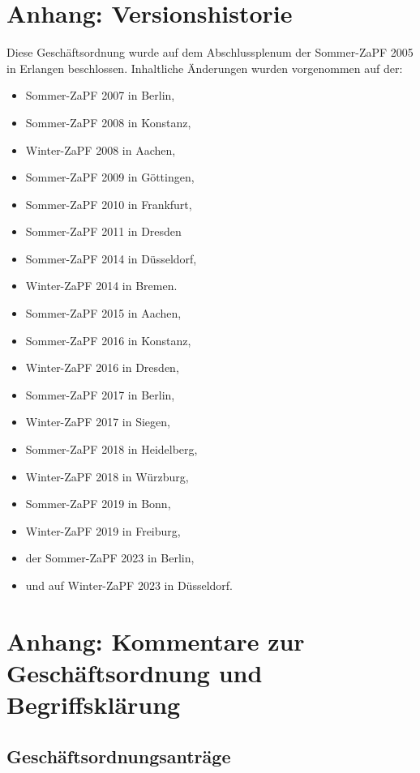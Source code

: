 \documentclass[
  a4paper,
  oneside]{scrartcl}
\providecommand{\tightlist}{%
  \setlength{\itemsep}{0pt}\setlength{\parskip}{0pt}}
\begin{document}
\section*{Anhang: Versionshistorie}\label{anhang-versionshistorie}

Diese Geschäftsordnung wurde auf dem Abschlussplenum der Sommer-ZaPF
2005 in Erlangen beschlossen. Inhaltliche Änderungen wurden vorgenommen
auf der:

\begin{itemize}
\tightlist
\item
  Sommer-ZaPF 2007 in Berlin,
\item
  Sommer-ZaPF 2008 in Konstanz,
\item
  Winter-ZaPF 2008 in Aachen,
\item
  Sommer-ZaPF 2009 in Göttingen,
\item
  Sommer-ZaPF 2010 in Frankfurt,
\item
  Sommer-ZaPF 2011 in Dresden
\item
  Sommer-ZaPF 2014 in Düsseldorf,
\item
  Winter-ZaPF 2014 in Bremen.
\item
  Sommer-ZaPF 2015 in Aachen,
\item
  Sommer-ZaPF 2016 in Konstanz,
\item
  Winter-ZaPF 2016 in Dresden,
\item
  Sommer-ZaPF 2017 in Berlin,
\item
  Winter-ZaPF 2017 in Siegen,
\item
  Sommer-ZaPF 2018 in Heidelberg,
\item
  Winter-ZaPF 2018 in Würzburg,
\item
  Sommer-ZaPF 2019 in Bonn,
\item
  Winter-ZaPF 2019 in Freiburg,
\item
  der Sommer-ZaPF 2023 in Berlin,
\item
  und auf Winter-ZaPF 2023 in Düsseldorf.
\end{itemize}

\section*{Anhang: Kommentare zur Geschäftsordnung und
Begriffsklärung}\label{anhang-kommentare-zur-geschuxe4ftsordnung-und-begriffskluxe4rung}

\subsection*{Geschäftsordnungsanträge}\label{geschuxe4ftsordnungsantruxe4ge-1}
\end{document}
